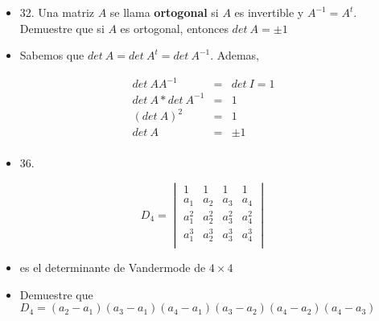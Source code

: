 \documentclass[
]{article}
\begin{document}
\begin{itemize}
\item
  32. Una matriz \(A\) se llama \textbf{ortogonal} si \(A\) es
  invertible y \(A^{- 1} = A^{t}\). Demuestre que si \(A\) es ortogonal,
  entonces \(det\ A = \pm 1\)
\end{itemize}

\begin{itemize}
\item
  Sabemos que \(det\ A = det\ A^{t} = det\ A^{- 1}\). Ademas,
\end{itemize}

\[\begin{matrix}
det\ AA^{- 1} & = & det\ I = 1 \\
det\ A*det\ A^{- 1} & = & 1 \\
(det\ A)^{2} & = & 1 \\
det\ A & = & \pm 1 \\
\end{matrix}\]

\begin{itemize}
\item
  36.
\end{itemize}

\[D_{4} = \begin{vmatrix}
1 & 1 & 1 & 1 \\
a_{1} & a_{2} & a_{3} & a_{4} \\
a_{1}^{2} & a_{2}^{2} & a_{3}^{2} & a_{4}^{2} \\
a_{1}^{3} & a_{2}^{3} & a_{3}^{3} & a_{4}^{3} \\
\end{vmatrix}\]

\begin{itemize}
\item
  es el determinante de Vandermode de \(4 \times 4\)
\end{itemize}

\begin{itemize}
\item
  Demuestre que
  \(D_{4} = (a_{2} - a_{1})(a_{3} - a_{1})(a_{4} - a_{1})(a_{3} - a_{2})(a_{4} - a_{2})(a_{4} - a_{3})\)
\end{itemize}
\end{document}
